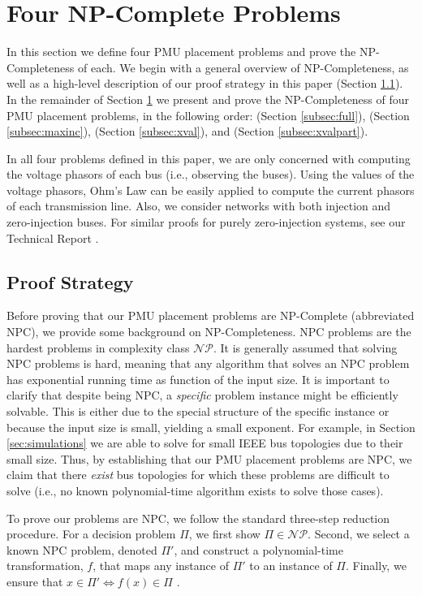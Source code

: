 \section{Four NP-Complete Problems}
\label{sec:problem-analysis}

In this section we define four PMU placement problems and prove the NP-Completeness of each. We begin with a general overview of NP-Completeness, as well as a high-level description of our proof 
strategy in this paper (Section \ref{subsec:proofstrat}). In the remainder of Section \ref{sec:problem-analysis} we present and prove the NP-Completeness of four PMU placement problems, 
in the following order: \full (Section \ref{subsec:full}), \maxinc (Section \ref{subsec:maxinc}), \xval (Section \ref{subsec:xval}), and \xvalpart (Section \ref{subsec:xvalpart}).

In all four problems defined in this paper, we are only concerned with computing the voltage phasors of each bus (i.e., observing the buses). Using the values of the voltage phasors,
Ohm's Law can be easily applied to compute the current phasors of each transmission line.
Also, we consider networks with both injection and zero-injection buses. For similar proofs for purely zero-injection systems, see our Technical Report \cite{Tech11}.

\subsection{Proof Strategy}
\label{subsec:proofstrat}
Before proving that our PMU placement problems are NP-Complete (abbreviated NPC), we provide some background on NP-Completeness. NPC problems are the hardest problems in complexity class $\mathcal{NP}$. 
It is generally assumed that solving NPC problems is hard, meaning that any algorithm that solves an NPC problem has exponential running time as function of the input size. It is important to clarify that despite being NPC, a {\em specific} problem instance might be efficiently solvable. This is either due to the special structure of the specific instance or because the input size is small, yielding a small exponent. 
For example, in Section \ref{sec:simulations} we are able to solve \full for small IEEE bus topologies due to their small size. Thus, by establishing that our PMU placement problems are NPC, we claim that there {\em exist} bus 
topologies for which these problems are difficult to solve (i.e., no known polynomial-time algorithm exists to solve those cases).  

To prove our problems are NPC, we follow the standard three-step reduction procedure. For a decision problem $\Pi$, we first show $\Pi\in\mathcal{NP}$. Second, we select a known NPC problem, denoted $\Pi'$,
and construct a polynomial-time transformation, $f$, that maps any instance of $\Pi'$  to an instance of $\Pi$. Finally, we ensure that $x\in\Pi'\Leftrightarrow f(x)\in\Pi$ \cite{Garey79}.

